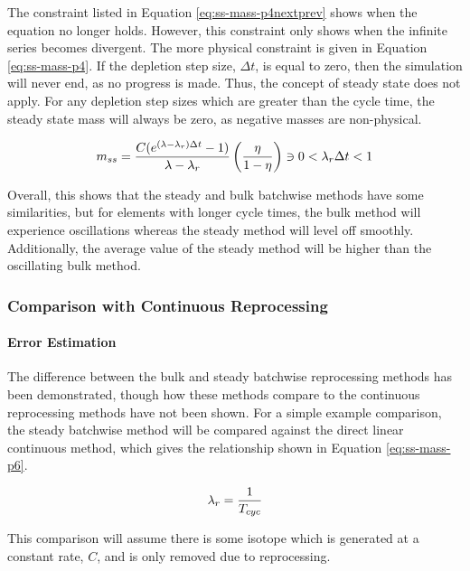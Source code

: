 The constraint listed in Equation \eqref{eq:ss-mass-p4nextprev} shows when the equation no longer holds. However, this constraint only shows when the infinite series becomes divergent. The more physical constraint is given in Equation \eqref{eq:ss-mass-p4}. If the depletion step size, $\Delta t$, is equal to zero, then the simulation will never end, as no progress is made. Thus, the concept of steady state does not apply. For any depletion step sizes which are greater than the cycle time, the steady state mass will always be zero, as negative masses are non-physical.

\begin{equation} \hfill
m_{ss} = \frac{C (e^{(\lambda - \lambda_r) \Delta t} - 1)}{\lambda - \lambda_r}  \left( \frac{\eta}{1 - \eta} \right) \ni 0 < \lambda_r \Delta t < 1
\hfill\label{eq:ss-mass-p4} \end{equation}

Overall, this shows that the steady and bulk batchwise methods have some similarities, but for elements with longer cycle times, the bulk method will experience oscillations whereas the steady method will level off smoothly. Additionally, the average value of the steady method will be higher than the oscillating bulk method.

\subsubsection{Comparison with Continuous Reprocessing}

\paragraph{Error Estimation}

The difference between the bulk and steady batchwise reprocessing methods has been demonstrated, though how these methods compare to the continuous reprocessing methods have not been shown. For a simple example comparison, the steady batchwise method will be compared against the direct linear continuous method, which gives the relationship shown in Equation \eqref{eq:ss-mass-p6}.

\begin{equation} \hfill
\lambda_r = \frac{1}{T_{cyc}}
\hfill\label{eq:ss-mass-p6} \end{equation}

This comparison will assume there is some isotope which is generated at a constant rate, $C$, and is only removed due to reprocessing.


